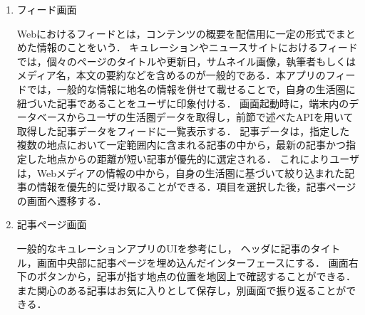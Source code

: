 \documentclass[a4paper]{jsarticle}
\begin{document}
\begin{enumerate}
\begin{enumerate}
\begin{enumerate}
  \item フィード画面

  Webにおけるフィードとは，コンテンツの概要を配信用に一定の形式でまとめた情報のことをいう．
  キュレーションやニュースサイトにおけるフィードでは，個々のページのタイトルや更新日，サムネイル画像，執筆者もしくはメディア名，本文の要約などを含めるのが一般的である．本アプリのフィードでは，一般的な情報に地名の情報を併せて載せることで，自身の生活圏に紐づいた記事であることをユーザに印象付ける．
  画面起動時に，端末内のデータベースからユーザの生活圏データを取得し，前節で述べたAPIを用いて取得した記事データをフィードに一覧表示する．
  記事データは，指定した複数の地点において一定範囲内に含まれる記事の中から，最新の記事かつ指定した地点からの距離が短い記事が優先的に選定される．
  これによりユーザは，Webメディアの情報の中から，自身の生活圏に基づいて絞り込まれた記事の情報を優先的に受け取ることができる．項目を選択した後，記事ページの画面へ遷移する．

  \item 記事ページ画面

  一般的なキュレーションアプリのUIを参考にし，
  ヘッダに記事のタイトル，画面中央部に記事ページを埋め込んだインターフェースにする．
  画面右下のボタンから，記事が指す地点の位置を地図上で確認することができる．また関心のある記事はお気に入りとして保存し，別画面で振り返ることができる．


\end{enumerate}






\end{enumerate}
\end{enumerate}
\end{document}
